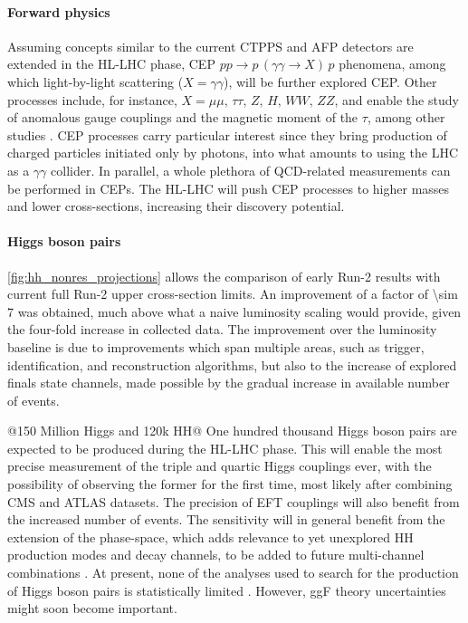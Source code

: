 \documentclass[11pt]{article}
\newcommand{\run}[1]{Run-#1}
\begin{document}
\paragraph{Forward physics}

Assuming concepts similar to the current \ac{CTPPS} \cite{ctpps_tdr} and \ac{AFP} \cite{afp_tdr} detectors are extended in the \ac{HL-LHC} phase, \ac{CEP} \(pp \rightarrow p\,(\gamma\gamma\rightarrow X)\,p\) phenomena, among which light-by-light scattering (\(X = \gamma\gamma\)), will be further explored \ac{CEP}.
Other processes include, for instance, \(X = \mu\mu,\,\tau\tau,\,Z,\,H,\,WW,\,ZZ\), and enable the study of anomalous gauge couplings and the magnetic moment of the \(\tau\), among other studies \cite{ctpps_varela,ctpps_pitt}.
\ac{CEP} processes carry particular interest since they bring production of charged particles initiated only by photons, into what amounts to using the \ac{LHC} as a \(\gamma\gamma\) collider.
In parallel, a whole plethora of \ac{QCD}-related measurements can be performed in \acp{CEP}.
The \ac{HL-LHC} will push \ac{CEP} processes to higher masses and lower cross-sections, increasing their discovery potential.


\paragraph{Higgs boson pairs}

\cref{fig:hh_nonres_projections} allows the comparison of early \run{2} results with current full \run{2} upper cross-section limits.
An improvement of a factor of \num{\sim 7} was obtained, much above what a naive luminosity scaling would provide, given the four-fold increase in collected data.
The improvement over the luminosity baseline is due to improvements which span multiple areas, such as trigger, identification, and reconstruction algorithms, but also to the increase of explored finals state channels, made possible by the gradual increase in available number of events.

@150 Million Higgs and 120k HH@
One hundred thousand Higgs boson pairs are expected to be produced during the \ac{HL-LHC} phase.
This will enable the most precise measurement of the triple and quartic Higgs couplings ever, with the possibility of observing the former for the first time, most likely after combining \ac{CMS} and \ac{ATLAS} datasets.
The precision of \ac{EFT} couplings will also benefit from the increased number of events.
The sensitivity will in general benefit from the extension of the phase-space, which adds relevance to yet unexplored HH production modes and decay channels, to be added to future multi-channel combinations \cite{higgs_10_years}.
At present, none of the analyses used to search for the production of Higgs boson pairs is statistically limited \cite{andre_david_higgs_ten_years}.
However, \ac{ggF} theory uncertainties might soon become important.
\end{document}
